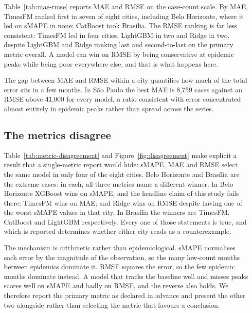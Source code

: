 \documentclass[11pt]{article}
\begin{document}
Table~\ref{tab:mae-rmse} reports MAE and RMSE on the case-count scale. By MAE, TimesFM
ranked first in seven of eight cities, including Belo Horizonte, where it led on sMAPE in
none; CatBoost took Bras\'ilia. The RMSE ranking is far less consistent: TimesFM led in
four cities, LightGBM in two and Ridge in two, despite LightGBM and Ridge ranking last and
second-to-last on the primary metric overall. A model can win on RMSE by being
conservative at epidemic peaks while being poor everywhere else, and that is what happens
here.

The gap between MAE and RMSE within a city quantifies how much of the total error sits in
a few months. In S\~ao Paulo the best MAE is 8{,}759 cases against an RMSE above 41{,}000
for every model, a ratio consistent with error concentrated almost entirely in epidemic
peaks rather than spread across the series.



\subsection{The metrics disagree}
\label{sec:metrics}
\label{sec:disagreement}

Table~\ref{tab:metric-disagreement} and Figure~\ref{fig:disagreement} make explicit a
result that a single-metric report would hide: sMAPE, MAE and RMSE select the same model
in only four of the eight cities. Belo Horizonte and Bras\'ilia are the extreme cases:
in each, all three metrics name a different winner. In Belo Horizonte XGBoost wins on
sMAPE, and the headline claim of this study fails there; TimesFM wins on MAE; and Ridge
wins on RMSE despite having one of the worst sMAPE values in that city. In Bras\'ilia the
winners are TimesFM, CatBoost and LightGBM respectively. Every one of those statements is
true, and which is reported determines whether either city reads as a counterexample.

The mechanism is arithmetic rather than epidemiological. sMAPE normalises each error by
the magnitude of the observation, so the many low-count months between epidemics dominate
it. RMSE squares the error, so the few epidemic months dominate instead. A model that
tracks the baseline well and misses peaks scores well on sMAPE and badly on RMSE, and the
reverse also holds. We therefore report the primary metric as declared in advance and
present the other two alongside rather than selecting the metric that favours a
conclusion.


\end{document}
